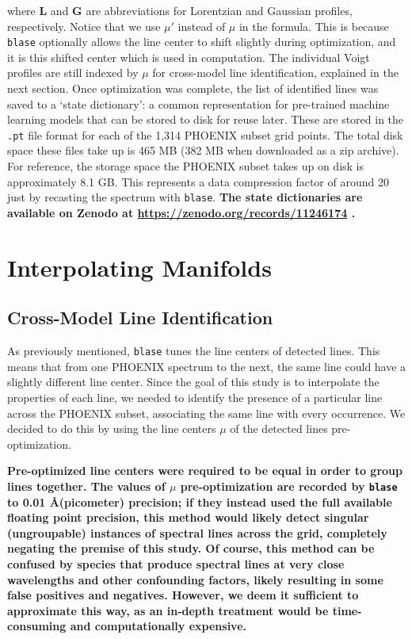 \documentclass[twocolumn, linenumbers]{aastex631}
\begin{document}
where $\mathbf{L}$ and $\mathbf{G}$ are abbreviations for Lorentzian and Gaussian profiles, respectively.
Notice that we use $\mu'$ instead of $\mu$ in the formula.
This is because \texttt{blase} optionally allows the line center to shift slightly during optimization, and it is this shifted center which is used in computation.
The individual Voigt profiles are still indexed by $\mu$ for cross-model line identification, explained in the next section.
Once optimization was complete, the list of identified lines was saved to a `state dictionary': a common representation for pre-trained machine learning models that can be stored to disk for reuse later.
These are stored in the \texttt{.pt} file format for each of the 1,314 PHOENIX subset grid points.
The total disk space these files take up is 465 MB (382 MB when downloaded as a zip archive).
For reference, the storage space the PHOENIX subset takes up on disk is approximately 8.1 GB.
This represents a data compression factor of around 20 just by recasting the spectrum with \texttt{blase}.
\textbf{The state dictionaries are available on Zenodo at \url{https://zenodo.org/records/11246174} \citep{zenodo}.}

\section{Interpolating Manifolds}
\label{sec:section3}
\subsection{Cross-Model Line Identification}
As previously mentioned, \texttt{blase} tunes the line centers of detected lines.
This means that from one PHOENIX spectrum to the next, the same line could have a slightly different line center.
Since the goal of this study is to interpolate the properties of each line, we needed to identify the presence of a particular line across the PHOENIX subset, associating the same line with every occurrence.
We decided to do this by using the line centers $\mu$ of the detected lines pre-optimization.

\textbf{Pre-optimized line centers were required to be equal in order to group lines together.
The values of $\mu$ pre-optimization are recorded by \texttt{blase} to 0.01 \AA (picometer) precision; if they instead used the full available floating point precision, this method would likely detect singular (ungroupable) instances of spectral lines across the grid, completely negating the premise of this study.
Of course, this method can be confused by species that produce spectral lines at very close wavelengths and other confounding factors, likely resulting in some false positives and negatives.
However, we deem it sufficient to approximate this way, as an in-depth treatment would be time-consuming and computationally expensive.}
\end{document}
